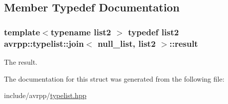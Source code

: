 \subsection{Member Typedef Documentation}
\hypertarget{structavrpp_1_1typelist_1_1join_3_01null__list_00_01list2_01_4_af412da0ee738464f73d716d4b1cc09db}{
\subsubsection[{result}]{\setlength{\rightskip}{0pt plus 5cm}template$<$typename list2 $>$ typedef list2 avrpp::typelist::join$<$ {\bf null\_\-list}, list2 $>$::{\bf result}}}
\label{structavrpp_1_1typelist_1_1join_3_01null__list_00_01list2_01_4_af412da0ee738464f73d716d4b1cc09db}


The result. 



The documentation for this struct was generated from the following file:\begin{DoxyCompactItemize}
\item 
include/avrpp/\hyperlink{typelist_8hpp}{typelist.hpp}\end{DoxyCompactItemize}
